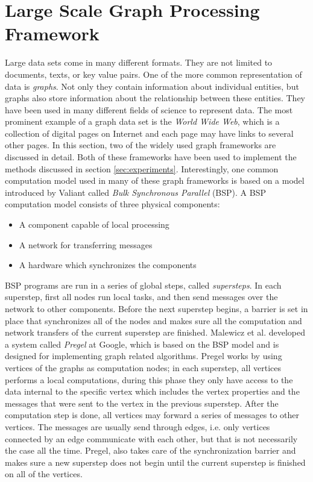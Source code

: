 \documentclass[english]{tktltiki}
\begin{document}
\section{Large Scale Graph Processing Framework}
Large data sets come in many different formats. They are not limited to documents, texts, or key value pairs. One of the more common representation of data is \textit{graphs}. Not only they contain information about individual entities, but graphs also store information about the relationship between these entities. They have been used in many different fields of science to represent data. The most prominent example of a graph data set is the \textit{World Wide Web}, which is a collection of digital pages on Internet and each page may have links to several other pages. In this section, two of the widely used graph frameworks are discussed in detail. Both of these frameworks have been used to implement the methods discussed in section \ref{sec:experiments}. Interestingly, one common computation model used in many of these graph frameworks is based on a model introduced by Valiant \cite{valiant90} called \textit{Bulk Synchronous Parallel} (BSP). A BSP computation model consists of three physical components: 
\begin{itemize}
\item
A component capable of local processing
\item
A network for transferring messages
\item
A hardware which synchronizes the components
\end{itemize}

BSP programs are run in a series of global steps, called \textit{supersteps}. In each superstep, first all nodes run local tasks, and then send messages over the network to other components. Before the next superstep begins, a barrier is set in place that synchronizes all of the nodes and makes sure all the computation and network transfers of the current superstep are finished. Malewicz et al. \cite{malewicz10} developed a system called \textit{Pregel} at Google, which is based on the BSP model and is designed for implementing graph related algorithms. Pregel works by using vertices of the graphs as computation nodes; in each superstep, all vertices performs a local computations, during this phase they only have access to the data internal to the specific vertex which includes the vertex properties and the messages that were sent to the vertex in the previous superstep. After the computation step is done, all vertices may forward a series of messages to other vertices. The messages are usually send through edges, i.e. only vertices connected by an edge communicate with each other, but that is not necessarily the case all the time. Pregel, also takes care of the synchronization barrier and makes sure a new superstep does not begin until the current superstep is finished on all of the vertices.
\end{document}
